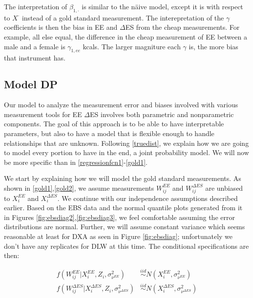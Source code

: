 \documentclass[11pt]{article}\usepackage[]{graphicx}\usepackage[]{color}
\begin{document}
The interpretation of $\beta_{1,\cdot}$ is similar to the n{\"a}ive model, except it is with respect to $X^{\cdot}$ instead of a gold standard measurement.  The interepretation of the $\gamma$ coefficients is then the bias in EE and $\Delta$ES from the cheap measurements. For example, all else equal, the difference in the cheap measurement of EE between a male and a female is $\gamma_{1,ee}$ kcals. The larger magniture each $\gamma$ is, the more bias that  instrument has. 




\subsection{Model DP}

Our model to analyze the measurement error and biases involved with various measurement tools for EE $\Delta$ES involves both parametric and nonparametric components. The goal of this approach is to be able to have interpretable parameters, but also to have a model that is flexible enough to handle relationships  that are unknown. Following \eqref{truedist}, we explain how we are going to model every portion to have in the end, a joint probability model. We will now be more specific than in \eqref{regressionfcn1}-\eqref{gold1}.

We start by explaining how we will model the gold standard measurements. As shown in \eqref{gold1},\eqref{gold2}, we assume measurements $W_{ij}^{EE}$ and $W_{ij}^{\Delta ES}$ are unbiased to $X_i^{EE}$ and $X_i^{\Delta ES}$. We continue with our independence assumptions described earlier. Based on the EBS data and the normal quantile plots generated from it in Figures \eqref{fig:ebsdiag2},\eqref{fig:ebsdiag3}, we feel comfortable assuming the error distributions are normal. Further, we will assume constant variance which seems reasonable at least for DXA as seen in Figure \eqref{fig:ebsdiag}; unfortunately we don't have any replicates for DLW at this time. The conditional specifications are then:

\begin{align}
  f(W_{ij}^{EE}|X_i^{EE},Z_i,\sigma_{\nu^{EE}}^2) &\overset{iid}{\sim} N(X_i^{EE},\sigma_{\nu^{EE}}^2) \\
    f(W_{ij}^{\Delta ES}|X_i^{\Delta ES},Z_i,\sigma_{\nu^{\Delta ES}}^2) &\overset{iid}{\sim} N(X_i^{\Delta ES},\sigma_{\nu^{\Delta ES}}^2) \\
\end{align}
\end{document}
